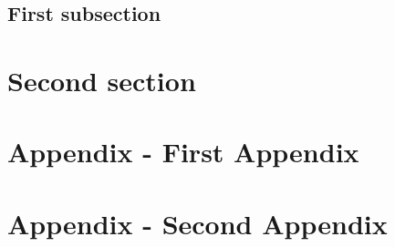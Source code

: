 \documentclass[12pt]{article}
\begin{document}
\subsection{First subsection}
\section{Second section}

\clearpage
\nocite{*} %



\clearpage
\appendix
\section{Appendix - First Appendix}
\section{Appendix - Second Appendix}
\end{document}
